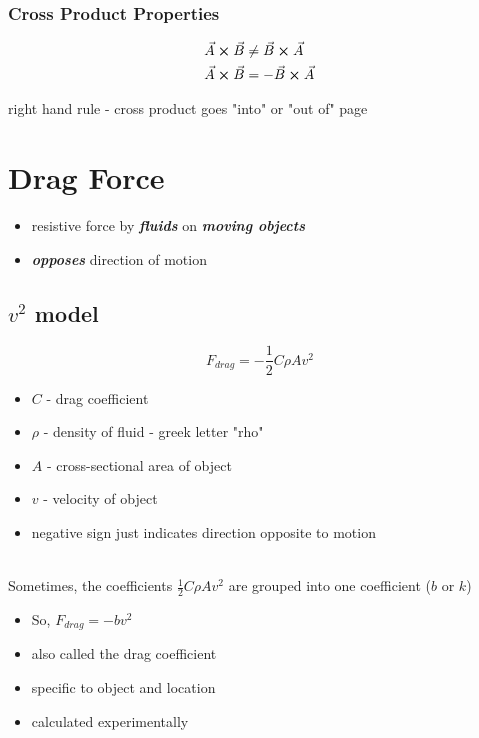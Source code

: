 \documentclass[titlepage]{article}
\begin{document}
\subsubsection{Cross Product Properties}

\begin{align*}
     & \vec{A} \cross \vec{B} \neq \vec{B} \cross \vec{A} \\
     & \vec{A} \cross \vec{B} = - \vec{B} \cross \vec{A}
\end{align*}

right hand rule - cross product goes "into" or "out of" page

\section{Drag Force}
\begin{itemize}
    \item resistive force by \textbf{\emph{fluids}} on \textbf{\emph{moving objects}}
    \item \textbf{\emph{opposes}} direction of motion
\end{itemize}

\subsection{\texorpdfstring{$v^2$}{v\^{}2} model}
\[ F_{drag} = - \frac{1}{2} C \rho A v^2 \]

\begin{itemize}
    \item $C$ - drag coefficient
    \item $\rho$ - density of fluid - greek letter "rho"
    \item $A$ - cross-sectional area of object
    \item $v$ - velocity of object
    \item negative sign just indicates direction opposite to motion
\end{itemize}
\ \\
Sometimes, the coefficients $\frac{1}{2}C \rho A v^2$ are grouped into one coefficient ($b$ or $k$)

\begin{itemize}
    \item So, $F_{drag} = -bv^2$
    \item also called the drag coefficient
    \item specific to object and location
    \item calculated experimentally
\end{itemize}
\end{document}
